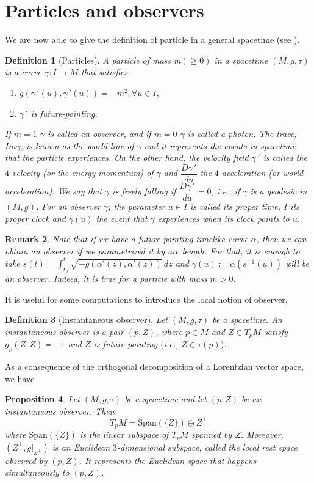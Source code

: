 \documentclass[11pt]{book}
\newtheorem{defi}{Definition}[chapter]
\newtheorem{pro}[defi]{Proposition}
\newtheorem{rem}[defi]{Remark}
\begin{document}
\section{Particles and observers}
We are now able to give the definition of particle in a general spacetime (see \cite{SW}).
\begin{defi}[Particles]
	A particle of mass m$(\ge 0)$ in a spacetime $(M,g,\tau)$ is a curve $\gamma:I\to M$ that satisfies
	\begin{enumerate}
		\item $g(\gamma{\,'}(u),\gamma{\,'}(u))=-m^2,\forall u\in I$,
		\item $\gamma{\,'}$ is future-pointing.
	\end{enumerate}
	If $m=1$ $\gamma$ is called an observer, and if $m=0$ $\gamma$ is called a photon. The trace, $Im\gamma$, is known as the world line of $\gamma$ and it represents the events in spacetime that the particle experiences. 
	On the other hand, the velocity field $\gamma{\,'}$ is called the $4$-velocity (or the energy-momentum) of $\gamma$ and $\dfrac{D\gamma{\,'}}{du}$ the $4$-acceleration (or world acceleration). We say that $\gamma$ is freely falling if $\dfrac{D\gamma{\,'}}{du}=0$, i.e., if $\gamma$ is a geodesic in $(M,g)$.
	For an observer $\gamma$, the parameter $u\in I$ is called its proper time, $I$ its proper clock and $\gamma(u)$ the event that $\gamma$ experiences when its clock points to $u$.
\end{defi}

\begin{rem}
	{\rm
		Note that if we have a future-pointing timelike curve $\alpha$, then we can obtain an observer if we parametrized it by arc length. For that, it is enough to take $s(t)=\int_{t_0}^{t} \sqrt{-g(\alpha'(z),\alpha'(z))}\, dz$ and $\gamma(u):=\alpha(s^{-1}(u))$ will be an observer. Indeed, it is true for a particle with mass $m>0$.
	}
\end{rem}

It is useful for some computations to introduce the local notion of observer,
\begin{defi}[Instantaneous observer]
	Let $(M,g,\tau)$ be a spacetime. An instantaneous observer is a pair $(p,Z)$, where $p\in M$ and $Z\in T_pM$ satisfy $g_p(Z,Z)=-1$ and $Z$ is future-pointing $($i.e., $Z\in \tau(p))$.
\end{defi}

As a consequence of the orthogonal decomposition of a Lorentzian vector space, we have
\begin{pro}\label{descomposicion}
	Let $(M,g,\tau)$ be a spacetime and let $(p,Z)$ be an instantaneous observer. Then
	\begin{equation}\label{ecuacion desc}
		T_pM=\textrm{Span}(\{Z\})\oplus Z^\perp 
	\end{equation}
	where $\textrm{Span}(\{Z\})$ is the linear subspace of $T_pM$ spanned by $Z$. Moreover, $(Z^\perp, g|_{Z^\perp})$ is an Euclidean $3$-dimensional subspace, called the local rest space observed by $(p,Z)$. It represents the Euclidean space that happens simultaneously to $(p,Z)$.
\end{pro}
\end{document}
